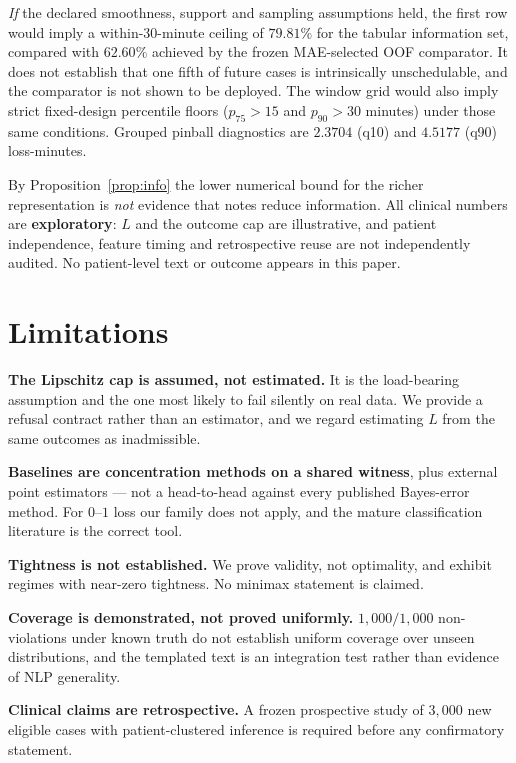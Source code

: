 \documentclass[11pt]{article}
\theoremstyle{definition}
\begin{document}
\emph{If} the declared smoothness, support and sampling assumptions held, the first row would imply a within-30-minute ceiling of $79.81\%$ for the tabular information set, compared with $62.60\%$ achieved by the frozen MAE-selected OOF comparator. It does not establish that one fifth of future cases is intrinsically unschedulable, and the comparator is not shown to be deployed. The window grid would also imply strict fixed-design percentile floors ($p_{75}>15$ and $p_{90}>30$ minutes) under those same conditions. Grouped pinball diagnostics are $2.3704$ (q10) and $4.5177$ (q90) loss-minutes.

By Proposition~\ref{prop:info} the lower numerical bound for the richer representation is \emph{not} evidence that notes reduce information. All clinical numbers are \textbf{exploratory}: $L$ and the outcome cap are illustrative, and patient independence, feature timing and retrospective reuse are not independently audited. No patient-level text or outcome appears in this paper.

\section{Limitations}

\textbf{The Lipschitz cap is assumed, not estimated.} It is the load-bearing assumption and the one most likely to fail silently on real data. We provide a refusal contract rather than an estimator, and we regard estimating $L$ from the same outcomes as inadmissible.

\textbf{Baselines are concentration methods on a shared witness}, plus external point estimators --- not a head-to-head against every published Bayes-error method. For $0$--$1$ loss our family does not apply, and the mature classification literature \citep{devroye,ishida} is the correct tool.

\textbf{Tightness is not established.} We prove validity, not optimality, and exhibit regimes with near-zero tightness. No minimax statement is claimed.

\textbf{Coverage is demonstrated, not proved uniformly.} $1{,}000/1{,}000$ non-violations under known truth do not establish uniform coverage over unseen distributions, and the templated text is an integration test rather than evidence of NLP generality.

\textbf{Clinical claims are retrospective.} A frozen prospective study of $3{,}000$ new eligible cases with patient-clustered inference is required before any confirmatory statement.
\end{document}
